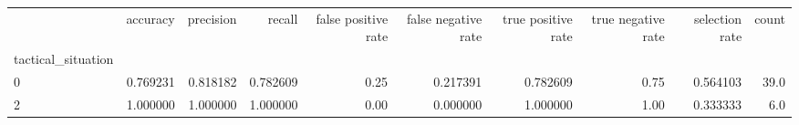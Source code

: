 \begin{tabular}{lrrrrrrrrr}
\toprule
{} &  accuracy &  precision &    recall &  false positive rate &  false negative rate &  true positive rate &  true negative rate &  selection rate &  count \\
tactical\_situation &           &            &           &                      &                      &                     &                     &                 &        \\
\midrule
0                  &  0.769231 &   0.818182 &  0.782609 &                 0.25 &             0.217391 &            0.782609 &                0.75 &        0.564103 &   39.0 \\
2                  &  1.000000 &   1.000000 &  1.000000 &                 0.00 &             0.000000 &            1.000000 &                1.00 &        0.333333 &    6.0 \\
\bottomrule
\end{tabular}
